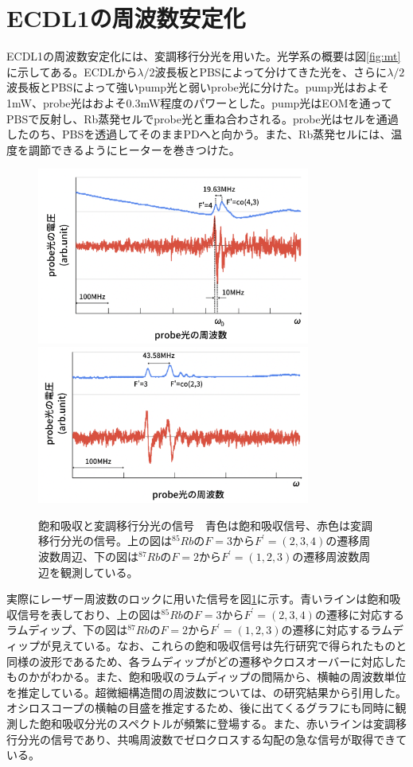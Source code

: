 \documentclass[dvipdfmx]{jsreport}
\begin{document}
\section{ECDL1の周波数安定化}
ECDL1の周波数安定化には、変調移行分光を用いた。光学系の概要は図\ref{fig:mt}に示してある。ECDLから$\lambda / 2$波長板とPBSによって分けてきた光を、さらに$\lambda / 2$波長板とPBSによって強いpump光と弱いprobe光に分けた。pump光はおよそ1mW、probe光はおよそ0.3mW程度のパワーとした。pump光はEOMを通ってPBSで反射し、Rb蒸発セルでprobe光と重ね合わされる。probe光はセルを通過したのち、PBSを透過してそのままPDへと向かう。また、Rb蒸発セルには、温度を調節できるようにヒーターを巻きつけた。
\begin{figure}
\centering
\includegraphics[width=0.8\textwidth]{images/mt85_graph.png}
\includegraphics[width=0.8\textwidth]{images/mt87_graph.png}
\caption{\label{fig:mt-graph}飽和吸収と変調移行分光の信号　青色は飽和吸収信号、赤色は変調移行分光の信号。上の図は$^{85}Rb$の$F=3$から$F^{'}=(2,3,4)$の遷移周波数周辺、下の図は$^{87}Rb$の$F=2$から$F^{'}=(1,2,3)$の遷移周波数周辺を観測している。}
\end{figure}
実際にレーザー周波数のロックに用いた信号を図\ref{fig:mt-graph}に示す。青いラインは飽和吸収信号を表しており、上の図は$^{85}Rb$の$F=3$から$F^{'}=(2,3,4)$の遷移に対応するラムディップ、下の図は$^{87}Rb$の$F=2$から$F^{'}=(1,2,3)$の遷移に対応するラムディップが見えている。なお、これらの飽和吸収信号は先行研究\cite{takase-y}\cite{1.6}で得られたものと同様の波形であるため、各ラムディップがどの遷移やクロスオーバーに対応したものかがわかる。また、飽和吸収のラムディップの間隔から、横軸の周波数単位を推定している。超微細構造間の周波数については、\cite{hyperfine}の研究結果から引用した。オシロスコープの横軸の目盛を推定するため、後に出てくるグラフにも同時に観測した飽和吸収分光のスペクトルが頻繁に登場する。また、赤いラインは変調移行分光の信号であり、共鳴周波数でゼロクロスする勾配の急な信号が取得できている。
\end{document}
